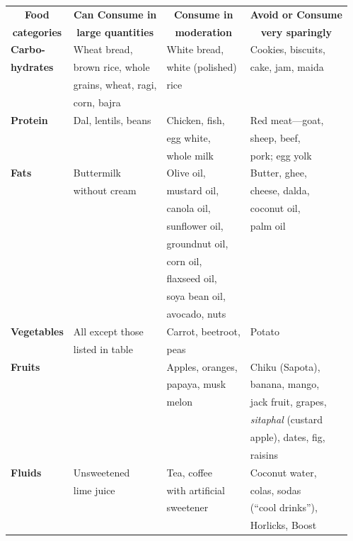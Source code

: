 {
\small\addtolength{\tabcolsep}{-5pt}
\begin{longtable}{|l|l|l|l|}
\hline
\multicolumn{1}{|c|}{\textbf{Food}} & \multicolumn{1}{|c|}{\textbf{Can Consume in}} & \multicolumn{1}{|c|}{\textbf{Consume in}} & \multicolumn{1}{|c|}{\textbf{Avoid or Consume}}\\
\multicolumn{1}{|c|}{\textbf{categories}} & \multicolumn{1}{|c|}{\textbf{large quantities}} & \multicolumn{1}{|c|}{\textbf{moderation}} & \multicolumn{1}{|c|}{\textbf{very sparingly}}\\
\hline
\textbf{Carbo-} & Wheat bread, & White bread, & Cookies, biscuits,\\
\textbf{hydrates} & brown rice, whole & white (polished) & cake, jam, maida\\
 & grains, wheat, ragi, & rice & \\
 & corn, bajra &  & \\
\hline
\textbf{Protein} & Dal, lentils, beans & Chicken, fish, & Red meat—goat,\\
 &  & egg white, & sheep, beef,\\
 &  & whole milk & pork; egg yolk\\
\hline
\textbf{Fats} & Buttermilk & Olive oil, & Butter, ghee,\\
 & without cream & mustard oil, & cheese, dalda,\\
 &  & canola oil, & coconut oil,\\
 &  & sunflower oil, & palm oil\\
 &  & groundnut oil, & \\
 &  & corn oil, & \\
 &  & flaxseed oil, & \\
 &  & soya bean oil, & \\
 &  & avocado, nuts & \\
\hline
\textbf{Vegetables} & All except those & Carrot, beetroot, & Potato\\
 & listed in table & peas & \\
\hline
\textbf{Fruits} &  & Apples, oranges, & Chiku (Sapota),\\
 &  & papaya, musk & banana, mango,\\
 &  & melon & jack fruit, grapes,\\
 &  &  & \textit{sitaphal} (custard\\
 &  &  & apple), dates, fig,\\
 &  &  & raisins\\
\hline
\textbf{Fluids} & Unsweetened & Tea, coffee & Coconut water,\\
 & lime juice & with artificial & colas, sodas\\
 &  & sweetener & (“cool drinks”),\\
 &  &  & Horlicks, Boost\\
\hline
\end{longtable}
}\relax

